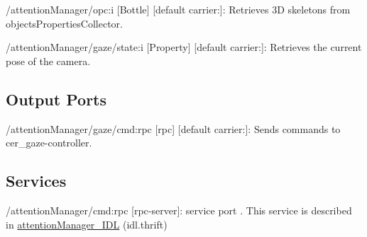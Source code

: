 \begin{DoxyItemize}
\item /attention\+Manager/opc\+:i \mbox{[}Bottle\mbox{]} \mbox{[}default carrier\+:\mbox{]}\+: Retrieves 3D skeletons from objects\+Properties\+Collector.
\item /attention\+Manager/gaze/state\+:i \mbox{[}Property\mbox{]} \mbox{[}default carrier\+:\mbox{]}\+: Retrieves the current pose of the camera.
\end{DoxyItemize}\hypertarget{group__skeletonViewer_outputports_sec}{}\subsection{Output Ports}\label{group__skeletonViewer_outputports_sec}

\begin{DoxyItemize}
\item /attention\+Manager/gaze/cmd\+:rpc \mbox{[}rpc\mbox{]} \mbox{[}default carrier\+:\mbox{]}\+: Sends commands to cer\+\_\+gaze-\/controller.
\end{DoxyItemize}\hypertarget{group__skeletonViewer_services_sec}{}\subsection{Services}\label{group__skeletonViewer_services_sec}

\begin{DoxyItemize}
\item /attention\+Manager/cmd\+:rpc \mbox{[}rpc-\/server\mbox{]}\+: service port . This service is described in \hyperlink{classattentionManager__IDL}{attention\+Manager\+\_\+\+I\+DL} (idl.\+thrift) 
\end{DoxyItemize}